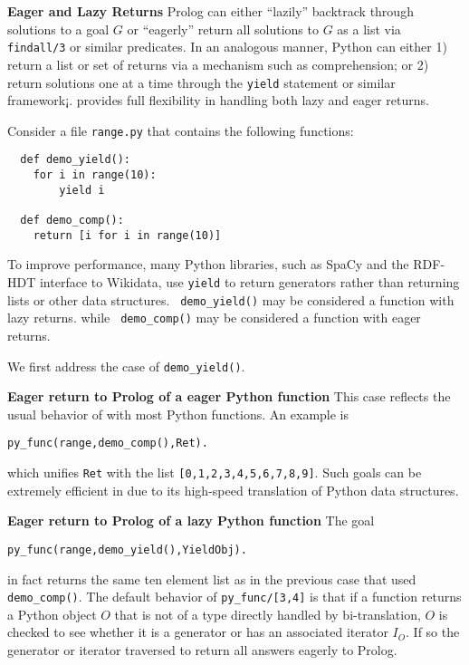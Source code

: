\begin{example} \rm {\bf Eager and Lazy Returns} \label{jns-examp:lazy-ret}
\noindent
  Prolog can either ``lazily'' backtrack through solutions to a goal
  $G$ or ``eagerly'' return all solutions to $G$ as a list via {\tt
    findall/3} or similar predicates.  In an analogous manner, Python
  can either 1) return a list or set of returns via a mechanism such
  as comprehension; or 2) return solutions one at a time through the
  {\tt yield} statement or similar framework¡.  \janus{} provides full
  flexibility in handling both lazy and eager returns.

  Consider a file {\tt range.py} that contains the following functions:
\begin{verbatim}
  def demo_yield(): 
    for i in range(10):
        yield i

  def demo_comp():
    return [i for i in range(10)]
\end{verbatim}
%
To improve performance, many Python libraries, such as SpaCy and the
RDF-HDT interface to Wikidata, use {\tt yield} to return generators
rather than returning lists or other data structures.  {\tt
  demo\_yield()} may be considered a function with lazy returns. while {\tt
  demo\_comp()} may be considered a function with eager returns.

We first address the case of {\tt demo\_yield()}.

\noindent
{\bf Eager return to Prolog of a eager Python function} This case
reflects the usual behavior of \janus{} with most Python functions.  An
example is

{\tt py\_func(range,demo\_comp(),Ret).}

\noindent
which unifies {\tt Ret} with the list {\tt [0,1,2,3,4,5,6,7,8,9]}.
Such goals can be extremely efficient in \janus{} due to its
high-speed translation of Python data structures.

\noindent
{\bf Eager return to Prolog of a lazy Python function}
The goal 

{\tt py\_func(range,demo\_yield(),YieldObj).}

\noindent
in fact returns the same ten element list as in the previous case that
used {\tt demo\_comp()}.  The default behavior of {\tt py\_func/[3,4]}
is that if a function returns a Python object $O$ that is not of a
type directly handled by bi-translation, $O$ is checked to see whether
it is a generator or has an associated iterator $I_O$.  If so the
generator or iterator traversed to return all answers eagerly to
Prolog.


\end{example}
